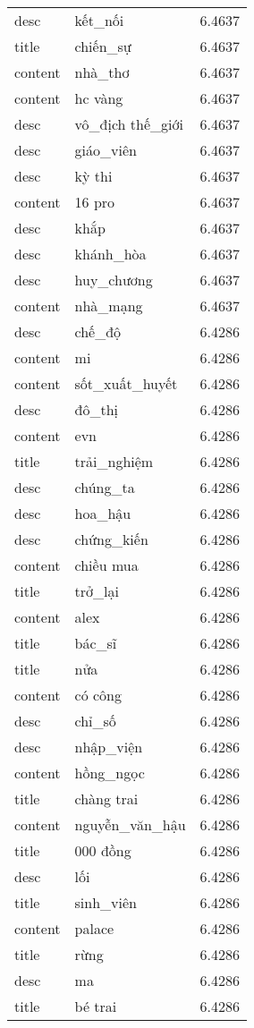 \documentclass{article}
\begin{document}
\begin{tabular}{lll}
desc & kết\_nối & 6.4637\\
title & chiến\_sự & 6.4637\\
content & nhà\_thơ & 6.4637\\
content & hc vàng & 6.4637\\
desc & vô\_địch thế\_giới & 6.4637\\
desc & giáo\_viên & 6.4637\\
desc & kỳ thi & 6.4637\\
content & 16 pro & 6.4637\\
desc & khắp & 6.4637\\
desc & khánh\_hòa & 6.4637\\
desc & huy\_chương & 6.4637\\
content & nhà\_mạng & 6.4637\\
desc & chế\_độ & 6.4286\\
content & mi & 6.4286\\
content & sốt\_xuất\_huyết & 6.4286\\
desc & đô\_thị & 6.4286\\
content & evn & 6.4286\\
title & trải\_nghiệm & 6.4286\\
desc & chúng\_ta & 6.4286\\
desc & hoa\_hậu & 6.4286\\
desc & chứng\_kiến & 6.4286\\
content & chiều mua & 6.4286\\
title & trở\_lại & 6.4286\\
content & alex & 6.4286\\
title & bác\_sĩ & 6.4286\\
title & nửa & 6.4286\\
content & có công & 6.4286\\
desc & chỉ\_số & 6.4286\\
desc & nhập\_viện & 6.4286\\
content & hồng\_ngọc & 6.4286\\
title & chàng trai & 6.4286\\
content & nguyễn\_văn\_hậu & 6.4286\\
title & 000 đồng & 6.4286\\
desc & lối & 6.4286\\
title & sinh\_viên & 6.4286\\
content & palace & 6.4286\\
title & rừng & 6.4286\\
desc & ma & 6.4286\\
title & bé trai & 6.4286\\

\end{tabular}
\end{document}
